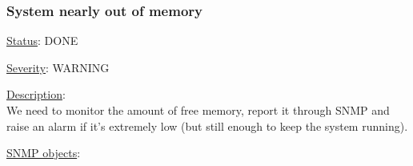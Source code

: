 \subsubsection{\bf System nearly out of memory}
		\label{fail:other:no_mem}
		\begin{pck_descr}
			\item [] \underline{Status}: DONE
			\item [] \underline{Severity}: WARNING
			\item [] \underline{Description}:\\
				We need to monitor the amount of free memory, report it through SNMP and
				raise an alarm if it's extremely low (but still enough to keep the
				system running).
			\item [] \underline{SNMP objects}:\\
				{\footnotesize
				\\
				\\
				\\
				\\
				\\
				\\
				 }
		\end{pck_descr}
